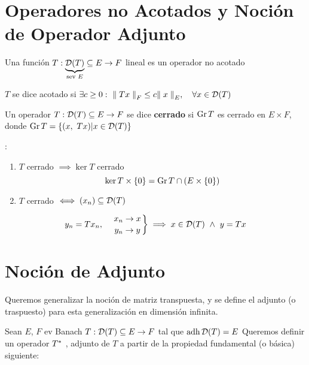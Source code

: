 
\renewcommand{\catnum}{9 (7 No Presencial)}%
\renewcommand{\fecha}{14 de abril de 2020}


\section*{Operadores no Acotados y Noción de Operador Adjunto}

\begin{defn}
Una función $T: \underbrace{\mathcal{D}(T)}_{\text{sev $E$}}  \subseteq E \to F$ lineal es un operador no acotado
\end{defn}

\begin{defn}
$T$ se dice acotado si $\exists c \geq 0 :\ \norm[F]{Tx} \leq c \norm[E]{x}, \quad \forall x \in \cd(T)$
\end{defn}

\begin{defn}
Un operador  $T: \mathcal{D}(T)  \subseteq E \to F$ se dice \textbf{cerrado} si $\operatorname{\mathop{\text{\upshape{Gr}}}} T$ es cerrado en $E \times F$, donde $\operatorname{\mathop{\text{\upshape{Gr}}}} T = \{ (x,\ Tx) | x \in \mathcal{D}(T) \}$
\end{defn}

\begin{note}: 
\begin{enumerate}[(1)]
    \item $T$ cerrado $\implies \ker T$  cerrado $$\ker T \times \{ 0 \} = \operatorname{\mathop{\text{\upshape{Gr}}}} T \cap (E \times \{ 0 \})$$
    
    \item$T$ cerrado $\iff (x_n) \subseteq \mathcal{D}(T)$
\end{enumerate}
$$y_n = T x_n , \quad 
\left.
x_n \to x \atop
y_n \to y
\right \} \implies x \in \mathcal{D}(T) \ \wedge \ y = T x$$
\end{note}

\section{Noción de Adjunto}

Queremos generalizar la noción de matriz transpuesta, y se define el adjunto (o traspuesto) para esta generalización en dimensión infinita.

Sean $E$, $F$ ev Banach
$T : \mathcal{D}(T) \subseteq E \to F$ tal que $\operatorname{\mathop{\text{\upshape{adh}}}} \mathcal{D}(T) = E$
Queremos definir un operador $T^{*}$ , adjunto de $T$ a partir de la propiedad fundamental (o básica) siguiente:

